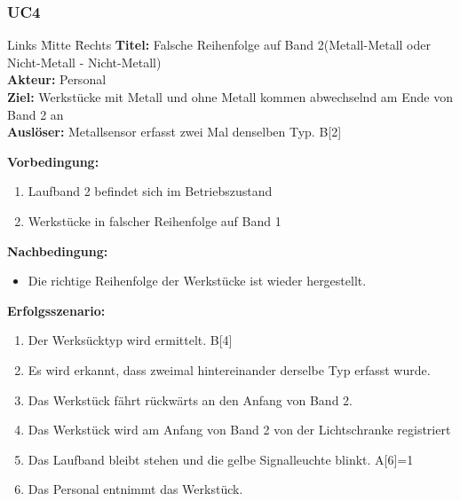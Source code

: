\documentclass[oneside,a4paper,titlepage]{scrartcl} %
\begin{document}
\subsubsection{UC4}
\begin{tabbing}
    Links \= Mitte \= Rechts \kill
    \textbf{Titel:} \> \> Falsche Reihenfolge auf Band 2(Metall-Metall oder Nicht-Metall - Nicht-Metall)\\
    \textbf{Akteur:} \> \> Personal\\
    \textbf{Ziel:} \> \> Werkstücke mit Metall und ohne Metall kommen abwechselnd am Ende von Band 2 an\\
    \textbf{Auslöser:} \> \> Metallsensor erfasst zwei Mal denselben Typ. B[2]\\
\end{tabbing}
\textbf{Vorbedingung:}
\begin{enumerate}
    \item Laufband 2 befindet sich im Betriebszustand
    \item Werkstücke in falscher Reihenfolge auf Band 1
\end{enumerate}
\textbf{Nachbedingung:}
\begin{itemize}
    \item Die richtige Reihenfolge der Werkstücke ist wieder hergestellt.
\end{itemize}
\textbf{Erfolgsszenario:}
\begin{enumerate}
 \item Der Werksücktyp wird ermittelt. B[4]
 \item Es wird erkannt, dass zweimal hintereinander derselbe Typ erfasst wurde.
 \item Das Werkstück fährt rückwärts an den Anfang von Band 2.
 \item Das Werkstück wird am Anfang von Band 2 von der Lichtschranke registriert
 \item Das Laufband bleibt stehen und die gelbe Signalleuchte blinkt. A[6]=1
 \item Das Personal entnimmt das Werkstück.
\end{enumerate}
\end{document}
